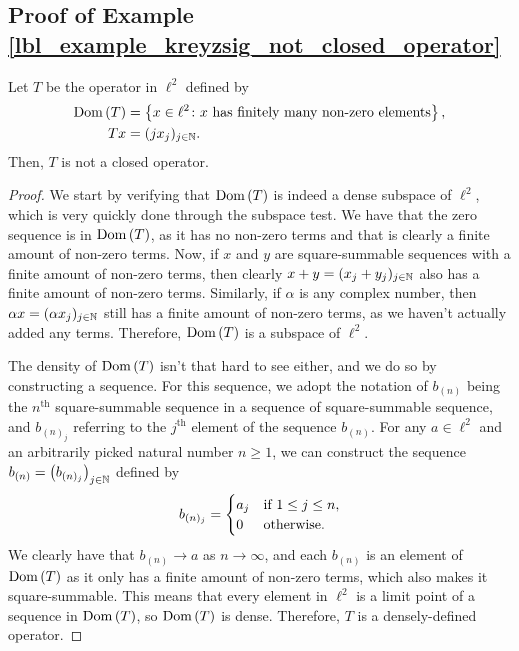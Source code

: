 \subsection{Proof of Example \eqref{lbl_example_kreyzsig_not_closed_operator}}\label{proof_lbl_example_kreyzsig_not_closed_operator}

\begin{example}
  Let $T$ be the operator in $\ell^2$ defined by
  \begin{align*}
    \operatorname{Dom}\left(T\right) &= \left\{x \in \ell^2 \colon \text{$x$ has finitely many non-zero elements}\right\}, \\
    Tx &= (jx_j)_{j \in \mathbb{N}}.
  \end{align*}
  Then, $T$ is not a closed operator.
\end{example}
\begin{proof}
  We start by verifying that $\operatorname{Dom}\left(T\right)$ is indeed a dense subspace of $\ell^2$, which is very quickly done through the subspace test. We have that the zero sequence is in $\operatorname{Dom}\left(T\right)$, as it has no non-zero terms and that is clearly a finite amount of non-zero terms. Now, if $x$ and $y$ are square-summable sequences with a finite amount of non-zero terms, then clearly $x+y = (x_j + y_j)_{j \in \mathbb{N}}$ also has a finite amount of non-zero terms. Similarly, if $\alpha$ is any complex number, then $\alpha x = (\alpha x_j)_{j \in \mathbb{N}}$ still has a finite amount of non-zero terms, as we haven't actually added any terms. Therefore, $\operatorname{Dom}\left(T\right)$ is a subspace of $\ell^2$.

  \medskip

  The density of $\operatorname{Dom}\left(T\right)$ isn't that hard to see either, and we do so by constructing a sequence. For this sequence, we adopt the notation of $b_{(n)}$ being the $n^\text{th}$ square-summable sequence in a sequence of square-summable sequence, and $b_{(n)_j}$ referring to the $j^\text{th}$ element of the sequence $b_{(n)}$. For any $a \in \ell^2$ and an arbitrarily picked natural number $n \geq 1$, we can construct the sequence $b_{(n)} = \left(b_{(n)_j}\right)_{j \in \mathbb{N}}$ defined by
  \begin{equation*}
    b_{(n)_j}
    =
    \begin{cases}
      a_j & \text{if $ 1 \leq j \leq n$}, \\
      0   & \text{otherwise}.
    \end{cases}
  \end{equation*}
  We clearly have that $b_{(n)} \to a$ as $n \to \infty$, and each $b_{(n)}$ is an element of $\operatorname{Dom}\left(T\right)$ as it only has a finite amount of non-zero terms, which also makes it square-summable. This means that every element in $\ell^2$ is a limit point of a sequence in $\operatorname{Dom}\left(T\right)$, so $\operatorname{Dom}\left(T\right)$ is dense. Therefore, $T$ is a densely-defined operator.


\end{proof}
